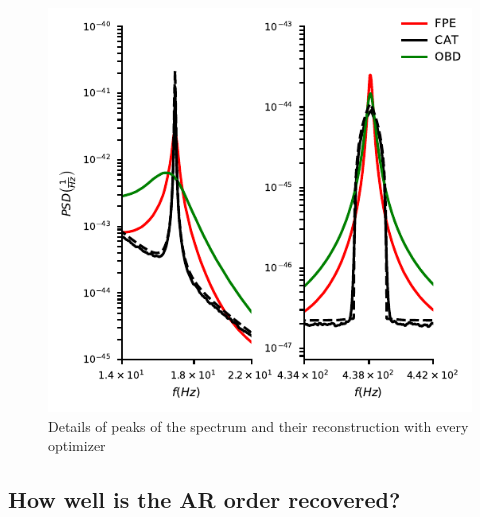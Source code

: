 \documentclass{aa}
\begin{document}
\begin{figure}[t]
        \includegraphics[width = \linewidth]{Images/optimisers_comparison/ligo/compare_estimates_peaks.pdf}
        \caption{Details of peaks of the spectrum and their reconstruction with every optimizer}
        \label{fig:ligoPeaks}
\end{figure}

\subsection{How well is the AR order recovered?}
\end{document}
